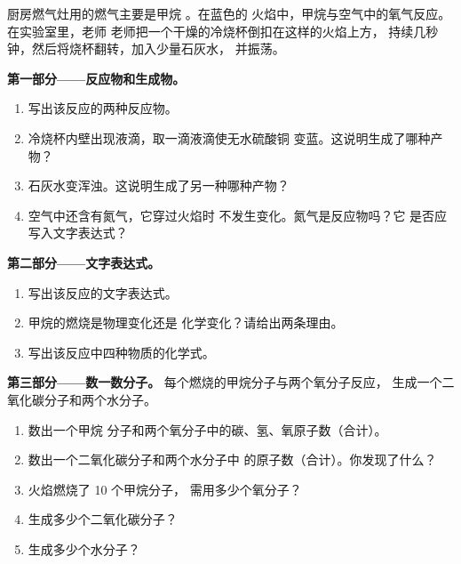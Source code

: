 \begin{problem}
\label{pb:g7:chemical-reactions:1}
厨房燃气灶用的燃气主要是甲烷 。在蓝色的
火焰中，甲烷与空气中的氧气反应。在实验室里，老师
老师把一个干燥的冷烧杯倒扣在这样的火焰上方，
持续几秒钟，然后将烧杯翻转，加入少量石灰水，
并振荡。

\medskip
\noindent\textbf{第一部分——反应物和生成物。}
\begin{enumerate}
  \item 写出该反应的两种反应物。
  \item 冷烧杯内壁出现液滴，取一滴液滴使无水硫酸铜
        变蓝。这说明生成了哪种产物？
  \item 石灰水变浑浊。这说明生成了另一种哪种产物？
  \item 空气中还含有氮气，它穿过火焰时
        不发生变化。氮气是反应物吗？它
        是否应写入文字表达式？
\end{enumerate}

\medskip
\noindent\textbf{第二部分——文字表达式。}
\begin{enumerate}[resume]
  \item 写出该反应的文字表达式。
  \item 甲烷的燃烧是物理变化还是
        化学变化？请给出两条理由。
  \item 写出该反应中四种物质的化学式。
\end{enumerate}

\medskip
\noindent\textbf{第三部分——数一数分子。}
每个燃烧的甲烷分子与两个氧分子反应，
生成一个二氧化碳分子和两个水分子。
\begin{enumerate}[resume]
  \item 数出一个甲烷
        分子和两个氧分子中的碳、氢、氧原子数（合计）。
  \item 数出一个二氧化碳分子和两个水分子中
        的原子数（合计）。你发现了什么？
  \item 火焰燃烧了 10 个甲烷分子，
        需用多少个氧分子？
  \item 生成多少个二氧化碳分子？
  \item 生成多少个水分子？
\end{enumerate}
\end{problem}
